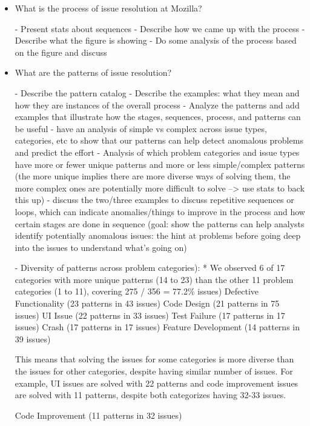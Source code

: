\begin{itemize}
\begin{itemize}
	\end{itemize}
	
	\item What is the process of issue resolution at Mozilla?
	
	- Present stats about sequences
	- Describe how we came up with the process
	- Describe what the figure is showing
	- Do some analysis of the process based on the figure and discuss
	
	
	\item What are the patterns of issue resolution?
	
	- Describe the pattern catalog
	- Describe the examples: what they mean and how they are instances of the overall process
	- Analyze the patterns and add examples that illustrate how the stages, sequences, process, and patterns can be useful
		- have an analysis of simple vs complex across issue types, categories, etc to show that our patterns can help detect anomalous problems and  predict the effort
				- Analysis of which problem categories  and issue types have more or fewer unique patterns and more or less simple/complex patterns (the more unique implies there are more diverse ways of solving them, the more complex ones are potentially more difficult to solve --> use stats to back this up)
		- discuss the two/three examples to discuss repetitive sequences or loops, which can indicate anomalies/things to improve in the process and how certain stages are done in sequence (goal: show the patterns can help analysts identify potentially anomalous issues: the hint at problems before going deep into the issues to understand what's going on)
		
		- Diversity of patterns across problem categories):
			* We observed 6 of 17 categories with more unique patterns (14 to 23) than the other 11 problem categories (1 to 11), covering 275 / 356 = 77.2\% issues)
			Defective Functionality (23 patterns in 43  issues)
			Code Design (21 patterns in 75  issues)
			UI Issue (22 patterns in  33 issues)
			Test Failure (17 patterns in 17  issues)
			Crash (17 patterns in  17 issues)
			Feature Development (14 patterns in 39  issues)
			
			This means that solving the issues for some categories is more diverse than the issues for other categories, despite having similar number of issues. For example, UI issues are solved with 22 patterns and code improvement issues are solved with 11 patterns, despite both categorizes having 32-33 issues.
			
			
			Code Improvement (11 patterns in  32 issues)
			

\end{itemize}
